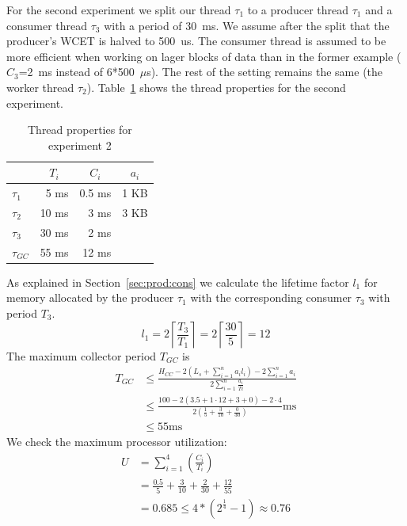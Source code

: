 For the second experiment we split our thread $\tau_1$ to a producer
thread $\tau_1$ and a consumer thread $\tau_3$ with a period of
30~ms. We assume after the split that the producer's WCET is halved
to 500~us. The consumer thread is assumed to be more efficient when
working on lager blocks of data than in the former example
($C_3$=2~ms instead of 6*500~$\mu$s). The rest of the setting
remains the same (the worker thread $\tau_2$). Table~\ref{fig:ex2}
shows the thread properties for the second experiment.

\begin{table}[tb]
\begin{center}
\begin{tabular}{lrrr}
    \toprule
    & \multicolumn{1}{c}{$T_i$} & \multicolumn{1}{c}{$C_i$} &\multicolumn{1}{c}{$a_i$} \\
    \midrule
    $\tau_1$ & 5 ms & 0.5 ms & 1 KB \\
    $\tau_2$ & 10 ms & 3 ms & 3 KB \\
    $\tau_3$ & 30 ms & 2 ms & \\
    $\tau_{GC}$ & 55 ms & 12 ms & \\
    \bottomrule
\end{tabular}
    \caption{Thread properties for experiment 2}
\label{fig:ex2}
\end{center}
\end{table}

As explained in Section~\ref{sec:prod:cons} we calculate the
lifetime factor $l_1$ for memory allocated by the producer $\tau_1$
with the corresponding consumer $\tau_3$ with period $T_3$.
\begin{equation*}
    l_1 = 2\left\lceil\frac{T_3}{T_1}\right\rceil
        = 2\left\lceil\frac{30}{5}\right\rceil
        = 12
\end{equation*}
%
The maximum collector period $T_{GC}$ is
\begin{align*}
    T_{GC} & \le \frac{H_{CC}-2\left(L_s+\sum_{i=1}^{n} a_i l_i\right)-2\sum_{i=1}^{n} a_i}
        {2\sum_{i=1}^{n} \frac{a_i}{Ti}} \\
           & \le \frac{100-2(3.5+1\cdot12+3+0)-2\cdot4}
           {2\left(\frac{1}{5}+\frac{3}{10}+\frac{0}{30}\right)}\mbox{ms}\\
           & \le 55\mbox{ms}
\end{align*}
We check the maximum processor utilization:
\begin{align*}
    U & = \sum_{i=1}^{4}\left(\frac{C_i}{T_i}\right)\\
      & = \frac{0.5}{5} + \frac{3}{10} + \frac{2}{30} + \frac{12}{55}\\
      & = 0.685 \le 4*(2^{\frac{1}{4}}-1) \approx 0.76
\end{align*}

